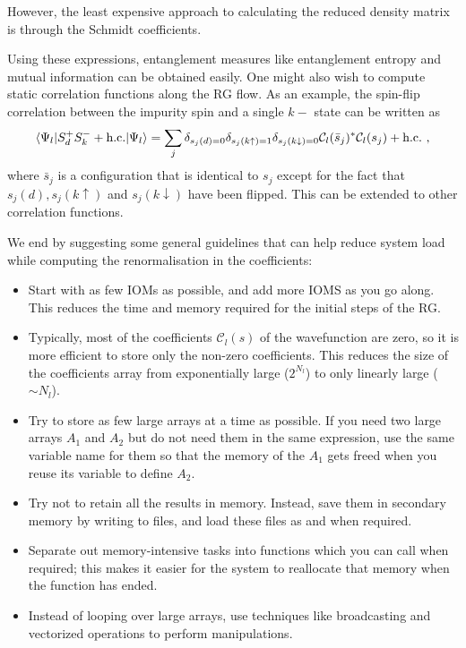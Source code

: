 \documentclass[prb]{revtex4-2}
\begin{document}
However, the least expensive approach to calculating the reduced density matrix is through the Schmidt coefficients. 

Using these expressions, entanglement measures like entanglement entropy and mutual information can be obtained easily. One might also wish to compute static correlation functions along the RG flow. As an example, the spin-flip correlation between the impurity spin and a single \(k-\) state can be written as
\begin{equation}\begin{aligned}
	\braket{\Psi_l | S_d^+S_k^- + \text{h.c.} | \Psi_l} = \sum_j \delta_{s_j(d)=0}\delta_{s_j(k\uparrow)=1}\delta_{s_j(k\downarrow)=0}\mathcal{C}_l(\bar s_j)^*\mathcal{C}_l(s_j) + \text{h.c.}~,
\end{aligned}\end{equation}
where \(\bar s_j\) is a configuration that is identical to \(s_j\) except for the fact that \(s_j(d),s_j(k \uparrow)\) and \(s_j(k \downarrow)\) have been flipped. This can be extended to other correlation functions.

We end by suggesting some general guidelines that can help reduce system load while computing the renormalisation in the coefficients:
\begin{itemize}
	\item Start with as few IOMs as possible, and add more IOMS as you go along. This reduces the time and memory required for the initial steps of the RG.
	\item Typically, most of the coefficients \(\mathcal{C}_l(s)\) of the wavefunction are zero, so it is more efficient to store only the non-zero coefficients. This reduces the size of the coefficients array from exponentially large (\(2^{N_l}\)) to only linearly large (\(\sim N_l\)).
	\item Try to store as few large arrays at a time as possible. If you need two large arrays \(A_1\) and \(A_2\) but do not need them in the same expression, use the same variable name for them so that the memory of the \(A_1\) gets freed when you reuse its variable to define \(A_2\).
	\item Try not to retain all the results in memory. Instead, save them in secondary memory by writing to files, and load these files as and when required.
	\item Separate out memory-intensive tasks into functions which you can call when required; this makes it easier for the system to reallocate that memory when the function has ended.
	\item Instead of looping over large arrays, use techniques like broadcasting and vectorized operations to perform manipulations.

\end{itemize}
\end{document}
